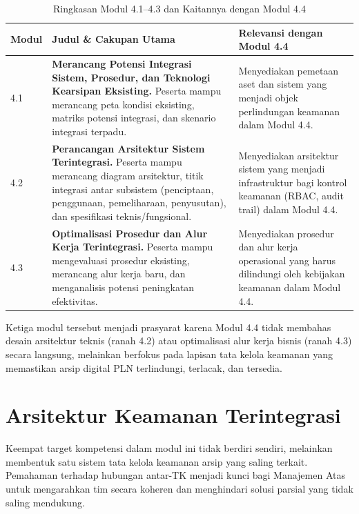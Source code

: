 \documentclass[12pt,a4paper]{report}
\begin{document}
\begin{table}[htbp]
\centering
\small
\caption{Ringkasan Modul 4.1--4.3 dan Kaitannya dengan Modul 4.4}
\label{tab:ringkasan-modul}
\begin{tabularx}{\textwidth}{@{} >{\raggedright\arraybackslash}p{1.5cm} X X @{}}
\toprule
\textbf{Modul} & \textbf{Judul \& Cakupan Utama} & \textbf{Relevansi dengan Modul 4.4} \\
\midrule
\rowcolor{rowalt}
4.1 & \textbf{Merancang Potensi Integrasi Sistem, Prosedur, dan Teknologi Kearsipan Eksisting.} Peserta mampu merancang peta kondisi eksisting, matriks potensi integrasi, dan skenario integrasi terpadu. & Menyediakan pemetaan aset dan sistem yang menjadi objek perlindungan keamanan dalam Modul 4.4. \\
\rowcolor{white}
4.2 & \textbf{Perancangan Arsitektur Sistem Terintegrasi.} Peserta mampu merancang diagram arsitektur, titik integrasi antar subsistem (penciptaan, penggunaan, pemeliharaan, penyusutan), dan spesifikasi teknis/fungsional. & Menyediakan arsitektur sistem yang menjadi infrastruktur bagi kontrol keamanan (RBAC, audit trail) dalam Modul 4.4. \\
\rowcolor{rowalt}
4.3 & \textbf{Optimalisasi Prosedur dan Alur Kerja Terintegrasi.} Peserta mampu mengevaluasi prosedur eksisting, merancang alur kerja baru, dan menganalisis potensi peningkatan efektivitas. & Menyediakan prosedur dan alur kerja operasional yang harus dilindungi oleh kebijakan keamanan dalam Modul 4.4. \\
\bottomrule
\end{tabularx}
\end{table}

\noindent Ketiga modul tersebut menjadi prasyarat karena Modul 4.4 tidak membahas desain arsitektur teknis (ranah 4.2) atau optimalisasi alur kerja bisnis (ranah 4.3) secara langsung, melainkan berfokus pada lapisan tata kelola keamanan yang memastikan arsip digital PLN terlindungi, terlacak, dan tersedia.


\section{Arsitektur Keamanan Terintegrasi}
Keempat target kompetensi dalam modul ini tidak berdiri sendiri, melainkan membentuk satu sistem tata kelola keamanan arsip yang saling terkait. Pemahaman terhadap hubungan antar-TK menjadi kunci bagi Manajemen Atas untuk mengarahkan tim secara koheren dan menghindari solusi parsial yang tidak saling mendukung.
\end{document}
